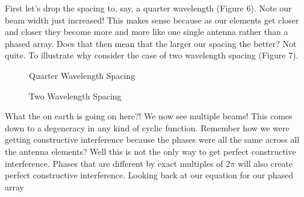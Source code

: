 \documentclass[10pt,a5paper]{book}
\begin{document}
First let's drop the spacing to, say, a quarter wavelength (Figure 6). Note our beam width just increased! This makes sense because as our elements get closer and closer they become more and more like one single antenna rather than a phased array. Does that then mean that the larger our spacing the better? Not quite. To illustrate why consider the case of two wavelength spacing (Figure 7). 

\begin{figure}[!htb]
\caption{\label{fig:my-label} Quarter Wavelength Spacing}
\end{figure}

\begin{figure}[!htb]
\caption{\label{fig:my-label} Two Wavelength Spacing}
\end{figure}

What the on earth is going on here?! We now see multiple beams! This comes down to a degeneracy in any kind of cyclic function. Remember how we were getting constructive interference because the phases were all the same across all the antenna elements? Well this is not the only way to get perfect constructive interference. Phases that are different by exact multiples of $2\pi$ will also create perfect constructive interference. Looking back at our equation for our phased array
\end{document}
